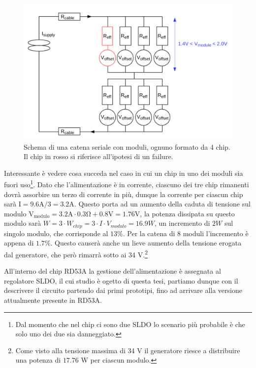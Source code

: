 \begin{figure}
\centering
\includegraphics[scale=.3]{Immagini/MultiChipModules}
\caption{Schema di una catena seriale con moduli, ognuno formato da 4 chip. Il chip in rosso si riferisce all'ipotesi di un failure.}
\label{MCM}
\end{figure}

Interessante è vedere cosa succeda nel caso in cui un chip in uno dei moduli sia fuori uso\footnote{Dal momento che nel chip ci sono due SLDO lo scenario più probabile è che solo uno dei due sia danneggiato.}.
Dato che l'alimentazione è in corrente, ciascuno dei tre chip rimanenti dovrà assorbire un terzo di corrente in più, dunque la corrente per ciascun chip sarà $\mathrm{I = 9.6A / 3 = 3.2 A}$. 
Questo porta ad un aumento della caduta di tensione sul modulo $\mathrm{V_{modulo} = 3.2 A \cdot 0.3 \Omega + 0.8 V = 1.76 V}$, la potenza dissipata su questo modulo sarà $W = 3 \cdot W_{chip} = 3 \cdot I \cdot V_{modulo} = 16.9 W$, un incremento di $2 W$ sul singolo modulo, che corrisponde al $13 \%$. Per la catena di 8 moduli l'incremento è appena di $1.7\%$. 
Questo causerà anche un lieve aumento della tensione erogata dal generatore, che però rimarrà sotto ai 34 V.\footnote{Come visto alla tensione massima di  34 V il generatore riesce a distribuire una potenza di $17.76$ W per ciascun modulo.} 

All'interno del chip RD53A la gestione dell'alimentazione è assegnata al regolatore SLDO, il cui studio è ogetto di questa tesi, partiamo dunque con il descrivere il circuito partendo dai primi prototipi, fino ad arrivare alla versione attualmente presente in RD53A.


